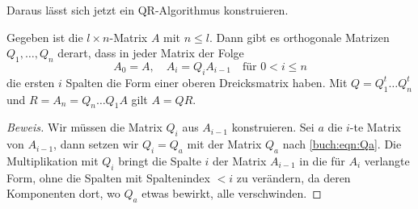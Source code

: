 Daraus lässt sich jetzt ein QR-Algorithmus konstruieren.

\begin{satz}
Gegeben ist die $l\times n$-Matrix $A$ mit $n\le l$.
Dann gibt es orthogonale Matrizen $Q_1,\dots,Q_n$ derart, dass in
jeder Matrix der Folge
\[
A_0 = A, \quad A_{i} = Q_{i}A_{i-1}\quad\text{für $0<i\le n$}
\]
die ersten $i$ Spalten die Form einer oberen Dreicksmatrix haben.
Mit $Q=Q_1^t\dots Q_n^t$ und $R=A_n=Q_n\dots Q_1A$ gilt $A=QR$.
\end{satz}

\begin{proof}[Beweis]
Wir müssen die Matrix $Q_i$ aus $A_{i-1}$ konstruieren.
Sei $a$ die $i$-te Matrix von $A_{i-1}$, dann setzen wir
$Q_i=Q_{a}$ mit der Matrix $Q_a$ nach \eqref{buch:eqn:Qa}.
Die Multiplikation mit $Q_i$ bringt die Spalte $i$ der Matrix 
$A_{i-1}$ in die für $A_{i}$ verlangte Form, ohne die 
Spalten mit Spaltenindex $<i$ zu verändern, da deren Komponenten dort,
wo $Q_a$ etwas bewirkt, alle verschwinden.
\end{proof}


